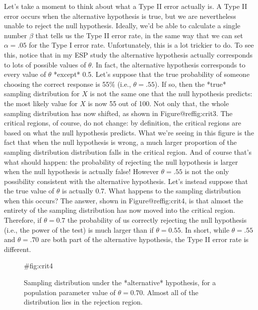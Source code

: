 Let's take a moment to think about what a Type II error actually is. A Type II error occurs when the alternative hypothesis is true, but we are nevertheless unable to reject the null hypothesis. Ideally, we'd be able to calculate a single number $\beta$ that tells us the Type II error rate, in the same way that we can set $\alpha = .05$ for the Type I error rate. Unfortunately, this is a lot trickier to do. To see this, notice that in my ESP study the alternative hypothesis actually corresponds to lots of possible values of $\theta$. In fact, the alternative hypothesis corresponds to every value of $\theta$ *except* 0.5. Let's suppose that the true probability of someone choosing the correct response is 55\% (i.e., $\theta = .55$). If so, then the *true* sampling distribution for $X$ is not the same one that the null hypothesis predicts: the most likely value for $X$ is now 55 out of 100. Not only that, the whole sampling distribution has now shifted, as shown in Figure@reffig:crit3. The critical regions, of course, do not change: by definition, the critical regions are based on what the null hypothesis predicts. What we're seeing in this figure is the fact that when the null hypothesis is wrong, a much larger proportion of the sampling distribution distribution falls in the critical region. And of course that's what should happen: the probability of rejecting the null hypothesis is larger when the null hypothesis is actually false!  However $\theta = .55$ is not the only possibility consistent with the alternative hypothesis. Let's instead suppose that the true value of $\theta$ is actually 0.7. What happens to the sampling distribution when this occurs? The answer, shown in Figure@reffig:crit4, is that almost the entirety of the sampling distribution has now moved into the critical region. Therefore, if $\theta = 0.7$ the probability of us correctly rejecting the null hypothesis (i.e., the power of the test) is much larger than if $\theta = 0.55$. In short, while $\theta = .55$ and $\theta = .70$ are both part of the alternative hypothesis, the Type II error rate is different.


\begin{figure}
\begin{center}
\caption{Sampling distribution under the *alternative* hypothesis, for a population parameter value of $\theta = 0.70$. Almost all of the distribution lies in the rejection region.}
\HR
{#fig:crit4}
\end{center}
\end{figure}


